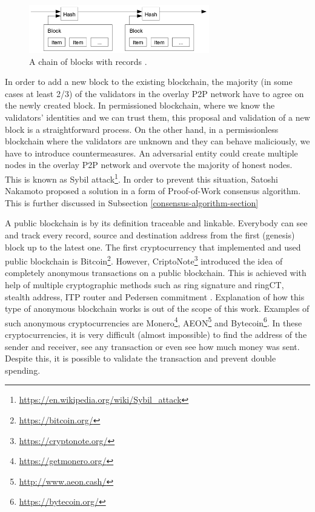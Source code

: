 \begin{figure}[ht]
	\centering
	\includegraphics[width=0.7\textwidth]{images/blockchain-satoshi.png}
	\caption{\label{fig:satoshi-blockchain}A chain of blocks with records \cite{nakamoto_bitcoin:_2008}.}
\end{figure}

In order to add a new block to the existing blockchain, the majority (in some cases at least 2/3) of the validators in the overlay P2P network have to agree on the newly created block. In permissioned blockchain, where we know the validators' identities and we can trust them, this proposal and validation of a new block is a straightforward process. On the other hand, in a permissionless blockchain where the validators are unknown and they can behave maliciously, we have to introduce countermeasures. An adversarial entity could create multiple nodes in the overlay P2P network and overvote the majority of honest nodes. This is known as Sybil attack\footnote{\url{https://en.wikipedia.org/wiki/Sybil_attack}}. In order to prevent this situation, Satoshi Nakamoto proposed a solution in a form of Proof-of-Work consensus algorithm. This is further discussed in Subsection \ref{consensus-algorithm-section}

A public blockchain is by its definition traceable and linkable. Everybody can see and track every record, source and destination address from the first (genesis) block up to the latest one. The first cryptocurrency that implemented and used public blockchain is Bitcoin\footnote{\url{https://bitcoin.org/}}. However, CriptoNote\footnote{\url{https://cryptonote.org/}} introduced the idea of completely anonymous transactions on a public blockchain. This is achieved with help of multiple cryptographic methods such as ring signature and ringCT, stealth address, ITP router and Pedersen commitment \cite{noether_ring_2015}. Explanation of how this type of anonymous blockchain works is out of the scope of this work. Examples of such anonymous cryptocurrencies are Monero\footnote{\url{https://getmonero.org/}}, AEON\footnote{\url{http://www.aeon.cash/}} and Bytecoin\footnote{\url{https://bytecoin.org/}}. In these cryptocurrencies, it is very difficult (almost impossible) to find the address of the sender and receiver, see any transaction or even see how much money was sent. Despite this, it is possible to validate the transaction and prevent double spending.

